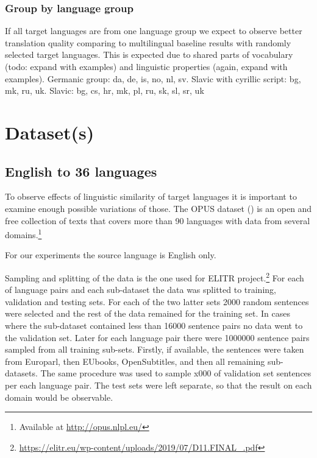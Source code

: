 \subsubsection*{Group by language group}

If all target languages are from one language group we expect to observe
better translation quality comparing to multilingual baseline results 
with randomly selected target languages.
This is expected due to shared parts of vocabulary (todo: expand with examples)
and linguistic properties (again, expand with examples).
Germanic group: da, de, is, no, nl, sv.
Slavic with cyrillic script: bg, mk, ru, uk.
Slavic: bg, cs, hr, mk, pl, ru, sk, sl, sr, uk

% 





\section{Dataset(s)}
\label{section:datasets}


\subsection{English to 36 languages}
\label{dataset:en-to-36}

To observe effects of linguistic similarity of target languages
it is important to examine enough possible variations of those.
The OPUS dataset (\cite{TIEDEMANN12.463}) is an open and free collection of texts
that covers more than 90 languages with data from several
domains.\footnote{Available at \url{http://opus.nlpl.eu/}} 

For our experiments the source language is English only.

Sampling and splitting of the data is the one used for
ELITR project.\footnote{\url{https://elitr.eu/wp-content/uploads/2019/07/D11.FINAL_.pdf}}
For each of language pairs and each sub-dataset
the data was splitted to training, validation and testing sets.
For each of the two latter sets 2000 random sentences were selected
and the rest of the data remained for the training set.
In cases where the sub-dataset contained less than 16000 sentence pairs
no data went to the validation set.
Later for each language pair there were 1000000 sentence pairs
sampled from all training sub-sets.
Firstly, if available, the sentences were taken from Europarl,
then EUbooks, OpenSubtitles, and then all remaining sub-datasets.
The same procedure was used to sample x000 of validation set sentences
per each language pair.
The test sets were left separate, so that the result on each domain would be observable.

